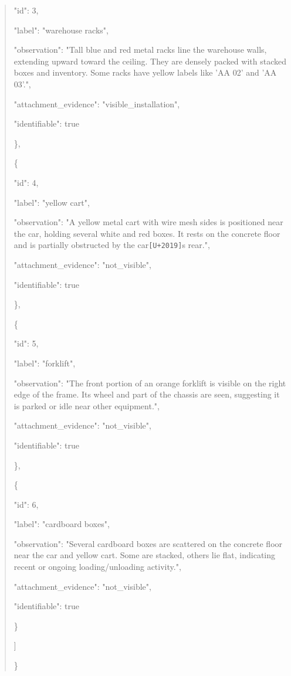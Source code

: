 \documentclass[10pt,a4paper]{article}
\begin{document}
\begin{quote}
      "id":\allowbreak{} 3,\allowbreak{}\par
      "label":\allowbreak{} "warehouse racks",\allowbreak{}\par
      "observation":\allowbreak{} "Tall blue and red metal racks line the warehouse walls,\allowbreak{} extending upward toward the ceiling. They are densely packed with stacked boxes and inventory. Some racks have yellow labels like 'AA 02' and 'AA 03'.",\allowbreak{}\par
      "attachment\_evidence":\allowbreak{} "visible\_installation",\allowbreak{}\par
      "identifiable":\allowbreak{} true\par
    \},\allowbreak{}\par
    \{\par
      "id":\allowbreak{} 4,\allowbreak{}\par
      "label":\allowbreak{} "yellow cart",\allowbreak{}\par
      "observation":\allowbreak{} "A yellow metal cart with wire mesh sides is positioned near the car,\allowbreak{} holding several white and red boxes. It rests on the concrete floor and is partially obstructed by the car\texttt{[U+2019]}s rear.",\allowbreak{}\par
      "attachment\_evidence":\allowbreak{} "not\_visible",\allowbreak{}\par
      "identifiable":\allowbreak{} true\par
    \},\allowbreak{}\par
    \{\par
      "id":\allowbreak{} 5,\allowbreak{}\par
      "label":\allowbreak{} "forklift",\allowbreak{}\par
      "observation":\allowbreak{} "The front portion of an orange forklift is visible on the right edge of the frame. Its wheel and part of the chassis are seen,\allowbreak{} suggesting it is parked or idle near other equipment.",\allowbreak{}\par
      "attachment\_evidence":\allowbreak{} "not\_visible",\allowbreak{}\par
      "identifiable":\allowbreak{} true\par
    \},\allowbreak{}\par
    \{\par
      "id":\allowbreak{} 6,\allowbreak{}\par
      "label":\allowbreak{} "cardboard boxes",\allowbreak{}\par
      "observation":\allowbreak{} "Several cardboard boxes are scattered on the concrete floor near the car and yellow cart. Some are stacked,\allowbreak{} others lie flat,\allowbreak{} indicating recent or ongoing loading/unloading activity.",\allowbreak{}\par
      "attachment\_evidence":\allowbreak{} "not\_visible",\allowbreak{}\par
      "identifiable":\allowbreak{} true\par
    \}\par
  ]\par
\}
\end{quote}
\end{document}
